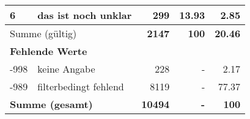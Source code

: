 \begin{longtable}{lXrrr}
     6 &
     \multicolumn{1}{X}{ das ist noch unklar   } &


       \num{299} &
       \num[round-mode=places,round-precision=2]{13.93} &
         \num[round-mode=places,round-precision=2]{2.85} \\
     \midrule
     \multicolumn{2}{l}{Summe (gültig)} &
       \textbf{\num{2147}} &
     \textbf{\num{100}} &
       \textbf{\num[round-mode=places,round-precision=2]{20.46}} \\
     \multicolumn{5}{l}{\textbf{Fehlende Werte}}\\
       -998 &
       keine Angabe &
         \num{228} &
        - &
         \num[round-mode=places,round-precision=2]{2.17} \\
       -989 &
       filterbedingt fehlend &
         \num{8119} &
        - &
         \num[round-mode=places,round-precision=2]{77.37} \\
     \midrule
     \multicolumn{2}{l}{\textbf{Summe (gesamt)}} &
          \textbf{\num{10494}} &
        \textbf{-} &
        \textbf{\num{100}} \\
     \bottomrule
     \end{longtable}
     
